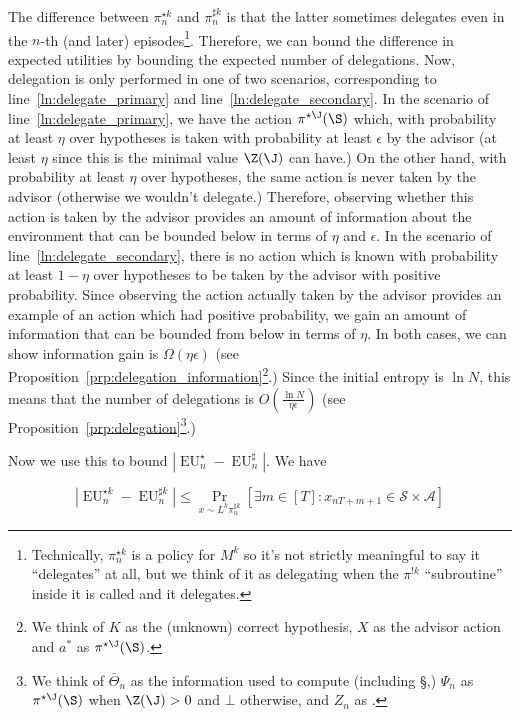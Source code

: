 \documentclass[anon,12pt]{colt2018} %
\newcommand{\AP}[1]{\left(#1\right)}
\newcommand{\AB}[1]{\left[#1\right]}
\newcommand{\Pa}[2]{\underset{#1}{\operatorname{Pr}}\AB{#2}}
\newcommand{\Abs}[1]{\left\vert #1 \right\vert}
\newcommand{\A}{\mathcal{A}}
\newcommand{\St}{\mathcal{S}}
\newcommand{\EU}{\operatorname{EU}}
\begin{document}
The difference between $\pi^{\star k}_n$ and $\pi^{\sharp k}_n$ is that the latter sometimes delegates even in the $n$-th (and later) episodes\footnote{Technically, $\pi^{\star k}_n$ is a policy for $M^k$ so it's not strictly meaningful to say it \enquote{delegates} at all, but we think of it as delegating when the $\pi^{!k}$ \enquote{subroutine} inside it is called and it delegates.}. Therefore, we can bound the difference in expected utilities by bounding the expected number of delegations. Now, delegation is only performed in one of two scenarios, corresponding to line~\ref{ln:delegate_primary} and line~\ref{ln:delegate_secondary}. In the scenario of line~\ref{ln:delegate_primary}, we have the action $\pi^{\star\J}(\S)$ which, with probability at least $\eta$ over hypotheses is taken with probability at least $\epsilon$ by the advisor (at least $\eta$ since this is the minimal value $\Z(\J)$ can have.) On the other hand, with probability at least $\eta$ over hypotheses, the same action is never taken by the advisor (otherwise we wouldn't delegate.) Therefore, observing whether this action is taken by the advisor provides an amount of information about the environment that can be bounded below in terms of $\eta$ and $\epsilon$. In the scenario of line~\ref{ln:delegate_secondary}, there is no action which is known with probability at least $1-\eta$ over hypotheses to be taken by the advisor with positive probability. Since observing the action actually taken by the advisor provides an example of an action which had positive probability, we gain an amount of information that can be bounded from below in terms of $\eta$. In both cases, we can show information gain is $\Omega(\eta\epsilon)$ (see Proposition~\ref{prp:delegation_information}\footnote{We think of $K$ as the (unknown) correct hypothesis, $X$ as the advisor action and $a^*$ as $\pi^{\star\J}(\S)$.}.) Since the initial entropy is $\ln{N}$, this means that the number of delegations is $O\AP{\frac{\ln{N}}{\eta\epsilon}}$ (see Proposition~\ref{prp:delegation}\footnote{We think of $\bar{\Theta}_n$ as the information used to compute \Z (including \S,) $\Psi_n$ as $\pi^{\star\J}(\S)$ when $\Z(\J)>0$ and $\bot$ otherwise, and $Z_n$ as \Z.}.)

Now we use this to bound $\Abs{\EU^\star_n-\EU^\sharp_n}$. We have

\begin{equation}
\Abs{\EU^{\star k}_n-\EU^{\sharp k}_n} \leq \Pa{x\sim L^k\pi^{\sharp k}_n}{\exists m \in [T]: x_{nT+m+1}\in\St \times \A}
\end{equation}
\end{document}

